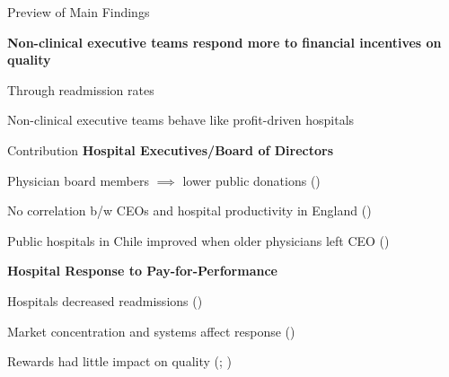 \documentclass[notes,11pt, aspectratio=169]{beamer}
\newenvironment{wideitemize}{\itemize\addtolength{\itemsep}{10pt}}{\enditemize}
\begin{document}
\begin{frame}{Preview of Main Findings}

\large

\textbf{Non-clinical executive teams respond more to financial incentives on quality}

\vspace{3mm}

\begin{wideitemize}
    \item Through readmission rates
    \item Non-clinical executive teams behave like profit-driven hospitals
\end{wideitemize}
\end{frame}

\begin{frame}{Contribution}
\large
    \textbf{Hospital Executives/Board of Directors}

\vspace{2mm}
    
    \begin{wideitemize}
        \item \normalsize Physician board members $\implies$ lower public donations \scriptsize (\cite{brickley2010board}) \normalsize
        \item No correlation b/w CEOs and hospital productivity in England \scriptsize (\cite{janke2019impact})\normalsize
        \item Public hospitals in Chile improved when older physicians left CEO \scriptsize (\cite{otero2022managers}) \normalsize
    \end{wideitemize}

    \vspace{5mm}\pause

    \textbf{Hospital Response to Pay-for-Performance}

\vspace{2mm}
    
    \begin{wideitemize}
        \item \normalsize Hospitals decreased readmissions \scriptsize (\cite{gupta2021impacts}) \normalsize
        \item Market concentration and systems affect response \scriptsize (\cite{kunz2024assessing}) \normalsize
        \item Rewards had little impact on quality \scriptsize (\cite{norton2018moneyball}; \cite{friedson2019so})
    \end{wideitemize}
\end{frame}
\end{document}
